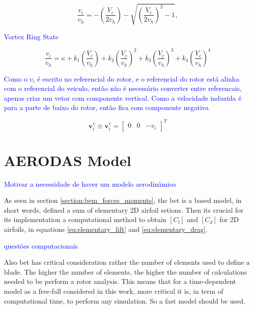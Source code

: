 \begin{equation}
    {\frac{v_{i}}{v_{h}}}=-\left({\frac{V_{c}}{2v_{h}}}\right)-{\sqrt{\left({\frac{V_{c}}{2v_{h}}}\right)^{2}-1}},
\end{equation}

\textcolor{blue}{Vortex Ring State}

\begin{equation}
    \frac{v_{i}}{v_{h}}=\kappa+k_{1}\left(\frac{V_{c}}{v_{h}}\right)+k_{2}\left(\frac{V_{c}}{v_{h}}\right)^{2}+k_{3}\left(\frac{V_{c}}{v_{h}}\right)^{3}+k_{4}\left(\frac{V_{c}}{v_{h}}\right)^{4}
\end{equation}

\textcolor{blue}{Como o $v_i$ é escrito no referencial do rotor, e o referencial do rotor está alinha com o referencial do veiculo, então não é necessário converter entre referencais, apenas criar um vetor com componente vertical. Como a velocidade induzida é para a parte de baixo do rotor, então fica com componente negativa}

\begin{equation}
   \boldsymbol{v}_{i}^v \equiv \boldsymbol{v}_{i}^r = \begin{bmatrix} 0 & 0 & -v_i \end{bmatrix}^T
\end{equation}



\section{AERODAS Model}
\label{section:aerodynamic_model}

\textcolor{blue}{Motivar a necessidade de haver um modelo aerodinâmico}

As seen in section \ref{section:bem_forces_moments}, the \gls{bet} is a based model, in short words, defined a sum of elementary 2D airfoil setions. Then its crucial for its implementation a computational method to obtain $\left[ C_l \right]$ and $\left[ C_d \right]$ for 2D airfoils, in equations \ref{eq:elementary_lift} and \ref{eq:elementary_drag}.

\textcolor{blue}{questões computacionais}

Also \gls{bet} has critical consideration rather the number of elements used to define a blade. The higher the number of elements, the higher the number of calculations needed to be perform a rotor analysis. This means that for a time-dependent model as a free-fall considered in this work, more critical it is, in term of computational time, to perform any simulation. So a fast model should be used.

